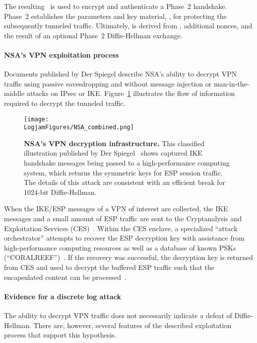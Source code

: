 The resulting \skeyid\ is used to encrypt and authenticate a Phase~2
handshake.  Phase~2 establishes the parameters and key material,
\keymat, for protecting the
subsequently tunneled traffic.  Ultimately, \keymat{} is derived from \skeyid,
additional nonces, and the result of an optional Phase~2
Diffie-Hellman exchange.

\paragraph{NSA's VPN exploitation process}
Documents published by Der Spiegel describe NSA's ability to decrypt VPN traffic using passive
eavesdropping and without message injection or
man-in-the-middle attacks on IPsec or IKE\@.
Figure~\ref{fig:scarynsafigure} illustrates the flow of information
required to decrypt the tunneled traffic.

\begin{figure}
        \noindent\texttt{[image: \\LogjamFigures/NSA\_combined.png]}
        \caption{\textbf{NSA's VPN decryption infrastructure.}  This
      classified illustration published by Der
      Spiegel~\cite{media-35526} shows captured IKE handshake messages
      being passed to a high-performance computing system, which
      returns the symmetric keys for ESP session traffic.  The details
      of this attack are consistent with an efficient break for
      1024-bit Diffie-Hellman.}
      \label{fig:scarynsafigure}
\end{figure}



When the IKE/ESP messages of a VPN of interest are collected, the IKE messages and a small amount of ESP traffic are sent to the Cryptanalysis and Exploitation Services (CES)~\cite{media-35526, media-35529, media-35515}. Within the CES enclave, a specialized ``attack orchestrator'' attempts to recover the ESP decryption key with assistance from high-performance computing resources as well as a database of known PSKs (``CORALREEF'')~\cite{media-35529, media-35526, media-35515}. If the recovery was successful, the decryption key is returned from CES and used to decrypt the buffered ESP traffic such that the encapsulated content can be processed~\cite{media-35529, media-35522}.

\paragraph{Evidence for a discrete log attack}
The ability to decrypt VPN traffic does not necessarily indicate a
defeat of Diffie-Hellman. There are, however, several features of the described exploitation process that support this hypothesis.

